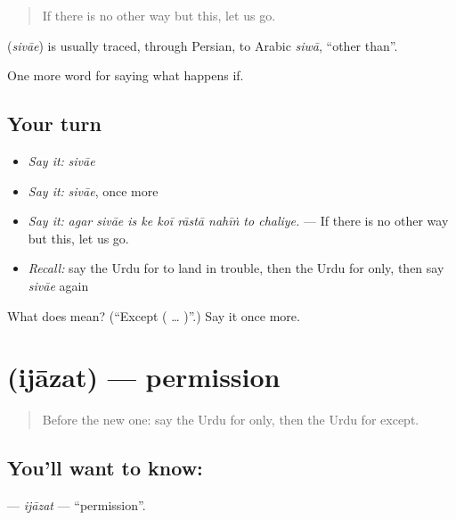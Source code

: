 \begin{quote}
If there is no other way but this, let us go.
\end{quote}

\begin{cousinweb}
\textbf{} (\emph{sivāe}) is usually traced, through Persian, to Arabic \emph{siwā}, \textquotedblleft{}other than\textquotedblright{}.
\end{cousinweb}

\begin{grammarlens}[title={What you've built}]
One more word for saying what happens if.
\end{grammarlens}

\subsection*{Your turn}
\begin{itemize}
\raggedright
  \item \emph{Say it:} \emph{sivāe}
  \item \emph{Say it:} \emph{sivāe}, once more
  \item \emph{Say it:} \emph{agar sivāe is ke koī rāstā nahīṅ to chaliye.} — If there is no other way but this, let us go.
  \item \emph{Recall:} say the Urdu for to land in trouble, then the Urdu for only, then say \emph{sivāe} again
\end{itemize}

\begin{tcolorbox}[breakable,colback=teal!4,colframe=teal!35!black,title={Before you move on}]
What does  mean? (\textquotedblleft{}Except ( … )\textquotedblright{}.) Say it once more.
\end{tcolorbox}
\section[\texorpdfstring{\ur{اجازت} (ijāzat)}{اجازت (ijāzat)}]{ (ijāzat) — permission}

\label{lesson:UR-C366-ijazat}



\begin{quote}
Before the new one: say the Urdu for only, then the Urdu for except.
\end{quote}

\subsection*{You'll want to know: }
\textbf{} — \emph{ijāzat} — \textquotedblleft{}permission\textquotedblright{}.

